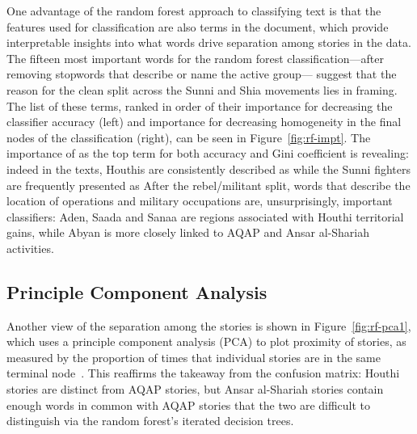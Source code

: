 One advantage of the random forest approach to classifying text is that the features
used for classification are also terms in the document, which provide
interpretable insights into what words drive separation among stories
in the data. The fifteen most important words for the random forest
classification---after removing stopwords that describe or name the
active group--- suggest that the reason for the clean split
across the Sunni and Shia movements lies in framing. The list of these
terms, ranked in order of their importance for decreasing the
classifier accuracy (left) and importance for decreasing homogeneity
in the final nodes of the classification (right), can be seen in
Figure~\ref{fig:rf-impt}. The importance of  as the top term
for both accuracy and Gini coefficient is revealing: indeed in the
texts, Houthis are consistently described as  while the Sunni fighters are
frequently presented as   After the rebel/militant
split, words that describe the location of operations and military occupations are, unsurprisingly, important classifiers:  Aden, Saada and Sanaa are
regions associated with Houthi territorial gains, while Abyan is more
closely linked to AQAP and Ansar al-Shariah
activities.

\subsection{Principle Component Analysis}

Another view of the separation among the stories is shown in
Figure~\ref{fig:rf-pca1}, which uses a principle component analysis (PCA) to
plot proximity of stories, as measured by the proportion of times that
individual stories are in the same terminal
node~\autocite{jones2015exploratory}.  This reaffirms the takeaway from
the confusion matrix: Houthi stories are distinct from AQAP stories,
but Ansar al-Shariah stories contain enough words in common with AQAP
stories that the two are difficult to distinguish via the random
forest's iterated decision trees.

